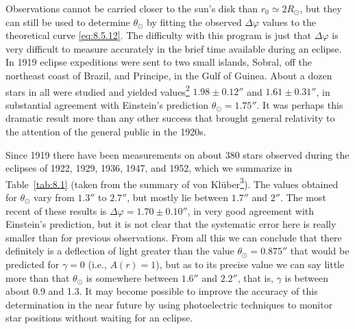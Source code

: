 Observations cannot be carried closer to the sun's disk than
\(r_0\simeq2R_\odot\), but they can still be used to determine
\(\theta_\odot\) by fitting the observed \(\Delta\varphi\) values to the
theoretical curve \eqref{eq:8.5.12}. The difficulty with this program is
just that \(\Delta\varphi\) is very difficult to measure accurately in the
brief time available during an eclipse. In 1919 eclipse expeditions were
sent to two small islands, Sobral, off the northeast coast of Brazil, and
Principe, in the Gulf of Guinea. About a dozen stars in all were studied and
yielded values\hyperref[ch8-ref-2]{\textsuperscript{2}}
\(1.98\pm0.12''\) and \(1.61\pm0.31''\), in substantial agreement with
Einstein's prediction \(\theta_\odot=1.75''\). It was perhaps this dramatic
result more than any other success that brought general relativity to the
attention of the general public in the 1920s.

Since 1919 there have been measurements on about 380 stars observed during
the eclipses of 1922, 1929, 1936, 1947, and 1952, which we summarize in
Table~\ref{tab:8.1} (taken from the summary of von
Kl\"uber\hyperref[ch8-ref-3]{\textsuperscript{3}}). The values obtained for
\(\theta_\odot\) vary from \(1.3''\) to \(2.7''\), but mostly lie between
\(1.7''\) and \(2''\). The most recent of these results is
\(\Delta\varphi=1.70\pm0.10''\), in very good agreement with Einstein's
prediction, but it is not clear that the systematic error here is really
smaller than for previous observations. From all this we can conclude that
there definitely is a deflection of light greater than the value
\(\theta_\odot=0.875''\) that would be predicted for \(\gamma=0\) (i.e.,
\(A(r)=1\)), but as to its precise value we can say little more than that
\(\theta_\odot\) is somewhere between \(1.6''\) and \(2.2''\), that is,
\(\gamma\) is between about 0.9 and 1.3. It may become possible to improve
the accuracy of this determination in the near future by using photoelectric
techniques to monitor star positions without waiting for an eclipse.

